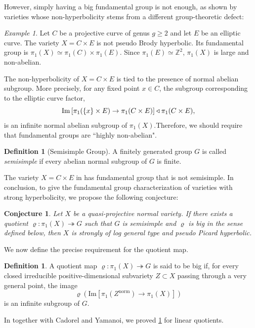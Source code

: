 \documentclass[english]{amsproc}
\theoremstyle{plain}
\newtheorem{conjecture}[thm]{Conjecture}
\theoremstyle{definition}
\newtheorem{dfn}[thm]{Definition}
\theoremstyle{remark}
\newtheorem{example}[thm]{Example}
\theoremstyle{plain}
\numberwithin{equation}{thm} %
\begin{document}
However, simply having a big fundamental group is not enough, as shown by varieties whose non-hyperbolicity stems from a different group-theoretic defect: 
\begin{example} \label{example2}
	Let $C$ be a projective curve of genus $g \geq 2$ and let $E$ be an elliptic curve. The variety $X = C \times E$ is not pseudo Brody hyperbolic. Its fundamental group is $\pi_1(X) \simeq \pi_1(C) \times \pi_1(E)$. Since $\pi_1(E) \simeq \mathbb{Z}^2$, $\pi_1(X)$ is large and non-abelian.
\end{example} 
The non-hyperbolicity of $X = C \times E$ is tied to the presence of normal abelian subgroup. More precisely, for any fixed point $x \in C$, the subgroup corresponding to the elliptic curve factor,
$$
{\rm Im}\left[\pi_1(\{x\}\times E)\to \pi_1(C\times E)\right] \triangleleft \pi_1(C\times E),
$$
is an infinite normal abelian subgroup of $\pi_1(X)$.Therefore, we should require that  fundamental groups are   ``highly non-abelian". 
\begin{dfn}[Semisimple Group]\label{dfn:semisimple}
A finitely generated group $G$ is called \emph{semisimple} if every abelian normal subgroup of $G$ is finite. 
\end{dfn} 
The variety $X = C \times E$ in  has  fundamental group  that is  not semisimple.  
In conclusion, to give  the fundamental group  characterization  of varieties with strong hyperbolicity, we propose the following conjecture: 
\begin{conjecture}\label{conj:funhyp}
	Let $X$ be a quasi-projective normal variety. If there exists a quotient $\varrho:\pi_1(X)\twoheadrightarrow G$ such that $G$ is {semisimple} and $\varrho$ is {big} in the sense defined below, then $X$ is {strongly of log general type} and {pseudo Picard hyperbolic}.
\end{conjecture}

We now define the precise requirement for the quotient map.

\begin{dfn}\label{dfn:big}
	A quotient map $\varrho:\pi_1(X)\twoheadrightarrow G$ is said to be {big} if, for every closed irreducible positive-dimensional subvariety $Z \subset X$ passing through a very general point, the image
	\[
	\varrho\left(\mathrm{Im} \left[\pi_1(Z^{\mathrm{norm}}) \longrightarrow \pi_1(X)\right]\right)
	\]
	is an infinite subgroup of $G$.
\end{dfn}

In \cite{CDY22,DY23b} together with Cadorel and Yamanoi, we proved \cref{conj:funhyp} for linear quotients. 
\end{document}
